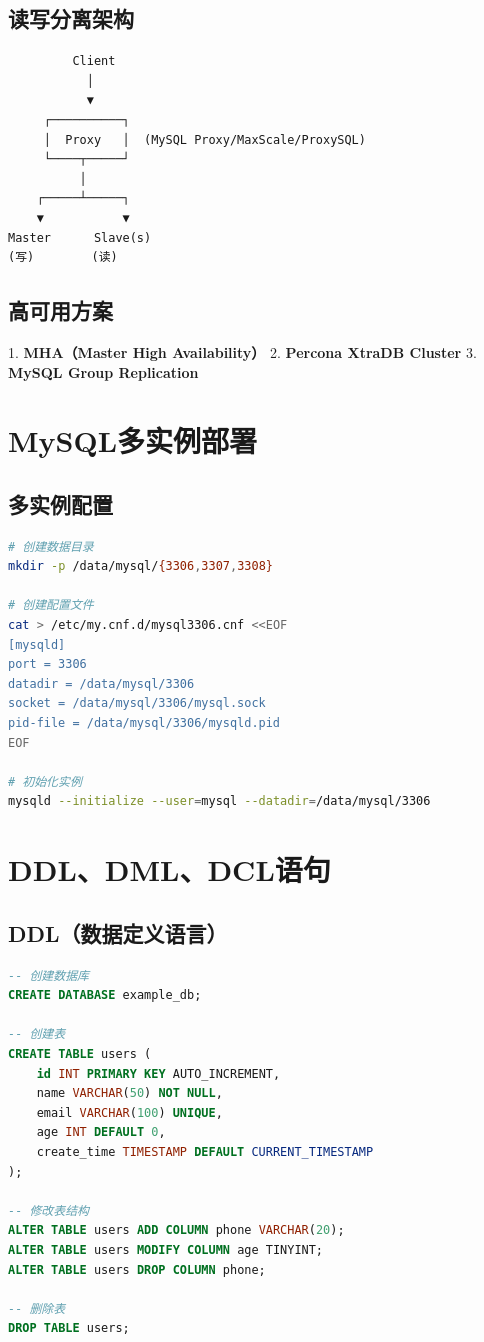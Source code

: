 \documentclass[12pt,UTF8]{ctexbook}
\begin{document}
\subsection*{读写分离架构}

\begin{lstlisting}
         Client
           │
           ▼
     ┌──────────┐
     │  Proxy   │  (MySQL Proxy/MaxScale/ProxySQL)
     └────┬─────┘
          │
    ┌─────┴─────┐
    ▼           ▼
Master      Slave(s)
(写)        (读)
\end{lstlisting}

\subsection*{高可用方案}

1. \textbf{MHA（Master High Availability）}
2. \textbf{Percona XtraDB Cluster}
3. \textbf{MySQL Group Replication}

\section{MySQL多实例部署}
\label{sec:mysql-multi-instance}

\subsection*{多实例配置}

\begin{lstlisting}[language=bash]
# 创建数据目录
mkdir -p /data/mysql/{3306,3307,3308}

# 创建配置文件
cat > /etc/my.cnf.d/mysql3306.cnf <<EOF
[mysqld]
port = 3306
datadir = /data/mysql/3306
socket = /data/mysql/3306/mysql.sock
pid-file = /data/mysql/3306/mysqld.pid
EOF

# 初始化实例
mysqld --initialize --user=mysql --datadir=/data/mysql/3306
\end{lstlisting}

\section{DDL、DML、DCL语句}
\label{sec:sql-statements}

\subsection*{DDL（数据定义语言）}

\begin{lstlisting}[language=sql]
-- 创建数据库
CREATE DATABASE example_db;

-- 创建表
CREATE TABLE users (
    id INT PRIMARY KEY AUTO_INCREMENT,
    name VARCHAR(50) NOT NULL,
    email VARCHAR(100) UNIQUE,
    age INT DEFAULT 0,
    create_time TIMESTAMP DEFAULT CURRENT_TIMESTAMP
);

-- 修改表结构
ALTER TABLE users ADD COLUMN phone VARCHAR(20);
ALTER TABLE users MODIFY COLUMN age TINYINT;
ALTER TABLE users DROP COLUMN phone;

-- 删除表
DROP TABLE users;
\end{lstlisting}
\end{document}
